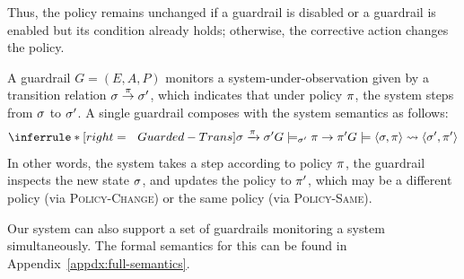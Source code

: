 Thus, the policy remains unchanged if a guardrail is disabled or a guardrail is enabled but its condition already holds; otherwise, the corrective action changes the policy.

A guardrail $G = (E,A,P)$ monitors a system-under-observation given by a transition relation ${\sigma}\overset{{\pi}}{\to}{\sigma'}$, which indicates that under policy $\pi$, the system steps from $\sigma$ to $\sigma'$. A single guardrail composes with the system semantics as follows:
\[
\inferrule*[right={~~Guarded-Trans}]
  { \sigma \xrightarrow{\pi} \sigma' \\
    G \models_{\sigma'} \pi \to \pi' }
  { G \models \langle \sigma,\pi\rangle  \rightsquigarrow \langle \sigma',\pi'\rangle }
\]
In other words, the system takes a step according to policy $\pi$, the guardrail inspects the new state $\sigma$, and updates the policy to $\pi'$, which may be a different policy (via \textsc{Policy-Change}) or the same policy (via \textsc{Policy-Same}).

Our system can also support a set of guardrails monitoring a system simultaneously. The formal semantics for this can be found in Appendix~\ref{appdx:full-semantics}.